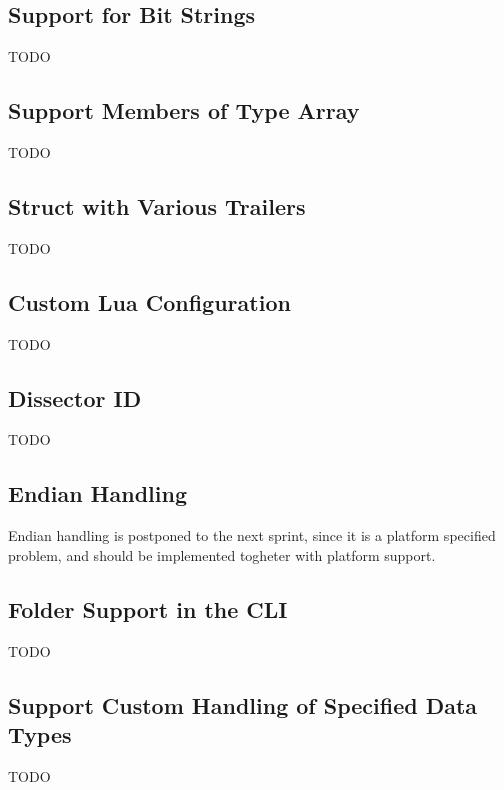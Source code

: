 



\subsection{Support for Bit Strings}
TODO

\subsection{Support Members of Type Array}
TODO

\subsection{Struct with Various Trailers}
TODO

\subsection{Custom Lua Configuration}
TODO

\subsection{Dissector ID}
TODO

\subsection{Endian Handling}
Endian handling is postponed to the next sprint, since it is a platform 
specified problem, and should be implemented togheter with platform support.

\subsection{Folder Support in the CLI}
TODO

\subsection{Support Custom Handling of Specified Data Types}
TODO

